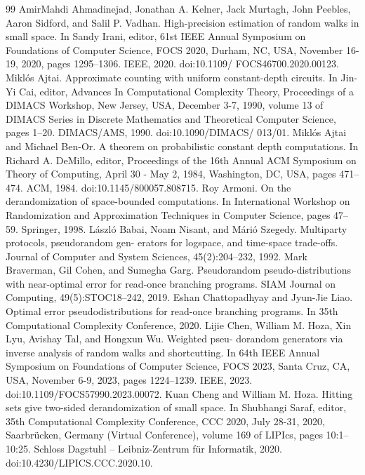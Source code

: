 \documentclass[10pt,a4paper]{article}
\begin{document}
\begin{thebibliography}{99}
 AmirMahdi Ahmadinejad, Jonathan A. Kelner, Jack Murtagh, John Peebles, Aaron Sidford, and Salil P. Vadhan. High-precision estimation of random walks in small space. In Sandy Irani, editor, 61st IEEE Annual Symposium on Foundations of Computer Science, FOCS 2020, Durham, NC, USA, November 16-19, 2020, pages 1295–1306. IEEE, 2020. doi:10.1109/ FOCS46700.2020.00123.
 Miklós Ajtai. Approximate counting with uniform constant-depth circuits. In Jin-Yi Cai, editor, Advances In Computational Complexity Theory, Proceedings of a DIMACS Workshop, New Jersey, USA, December 3-7, 1990, volume 13 of DIMACS Series in Discrete Mathematics and Theoretical Computer Science, pages 1–20. DIMACS/AMS, 1990. doi:10.1090/DIMACS/ 013/01.
 Miklós Ajtai and Michael Ben-Or. A theorem on probabilistic constant depth computations. In Richard A. DeMillo, editor, Proceedings of the 16th Annual ACM Symposium on Theory of Computing, April 30 - May 2, 1984, Washington, DC, USA, pages 471–474. ACM, 1984. doi:10.1145/800057.808715.
 Roy Armoni. On the derandomization of space-bounded computations. In International Workshop on Randomization and Approximation Techniques in Computer Science, pages 47–59. Springer, 1998.
 László Babai, Noam Nisant, and Márió Szegedy. Multiparty protocols, pseudorandom gen- erators for logspace, and time-space trade-offs. Journal of Computer and System Sciences, 45(2):204–232, 1992.
 Mark Braverman, Gil Cohen, and Sumegha Garg. Pseudorandom pseudo-distributions with near-optimal error for read-once branching programs. SIAM Journal on Computing, 49(5):STOC18–242, 2019.
 Eshan Chattopadhyay and Jyun-Jie Liao. Optimal error pseudodistributions for read-once branching programs. In 35th Computational Complexity Conference, 2020.
 Lijie Chen, William M. Hoza, Xin Lyu, Avishay Tal, and Hongxun Wu. Weighted pseu- dorandom generators via inverse analysis of random walks and shortcutting. In 64th IEEE Annual Symposium on Foundations of Computer Science, FOCS 2023, Santa Cruz, CA, USA, November 6-9, 2023, pages 1224–1239. IEEE, 2023. doi:10.1109/FOCS57990.2023.00072.
 Kuan Cheng and William M. Hoza. Hitting sets give two-sided derandomization of small space. In Shubhangi Saraf, editor, 35th Computational Complexity Conference, CCC 2020, July 28-31, 2020, Saarbrücken, Germany (Virtual Conference), volume 169 of LIPIcs, pages 10:1–10:25. Schloss Dagstuhl – Leibniz-Zentrum für Informatik, 2020. doi:10.4230/LIPICS.CCC.2020.10.

\end{thebibliography}
\end{document}
